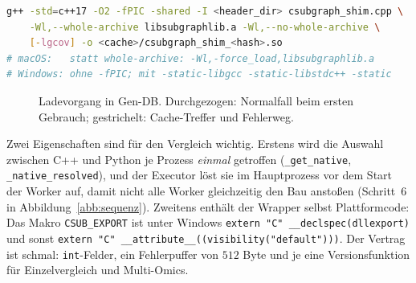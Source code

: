 \begin{lstlisting}[language=bash, caption={Aufruf, mit dem Gen-DB den Wrapper baut (aus \texttt{build\_shared\_library}, gekuerzt; Linux)}, label={lst:gendb_build}]
g++ -std=c++17 -O2 -fPIC -shared -I <header_dir> csubgraph_shim.cpp \
    -Wl,--whole-archive libsubgraphlib.a -Wl,--no-whole-archive \
    [-lgcov] -o <cache>/csubgraph_shim_<hash>.so
# macOS:   statt whole-archive: -Wl,-force_load,libsubgraphlib.a
# Windows: ohne -fPIC; mit -static-libgcc -static-libstdc++ -static
\end{lstlisting}

\begin{figure}[!ht]
	\centering
	\caption{Ladevorgang in Gen-DB. Durchgezogen: Normalfall beim ersten Gebrauch; gestrichelt: Cache-Treffer und Fehlerweg.}
	\label{abb:laden_gendb}
\end{figure}

Zwei Eigenschaften sind für den Vergleich wichtig. Erstens wird die Auswahl zwischen C++ und Python je Prozess \emph{einmal} getroffen (\texttt{\_get\_native}, \texttt{\_native\_resolved}), und der Executor löst sie im Hauptprozess vor dem Start der Worker auf, damit nicht alle Worker gleichzeitig den Bau anstoßen (Schritt~6 in Abbildung~\ref{abb:sequenz}). Zweitens enthält der Wrapper selbst Plattformcode: Das Makro \texttt{CSUB\_EXPORT} ist unter Windows \texttt{extern "C" \_\_declspec(dllexport)} und sonst \texttt{extern "C" \_\_attribute\_\_((visibility("default")))}. Der Vertrag ist schmal: \texttt{int}-Felder, ein Fehlerpuffer von $512$ Byte und je eine Versionsfunktion für Einzelvergleich und Multi-Omics.

